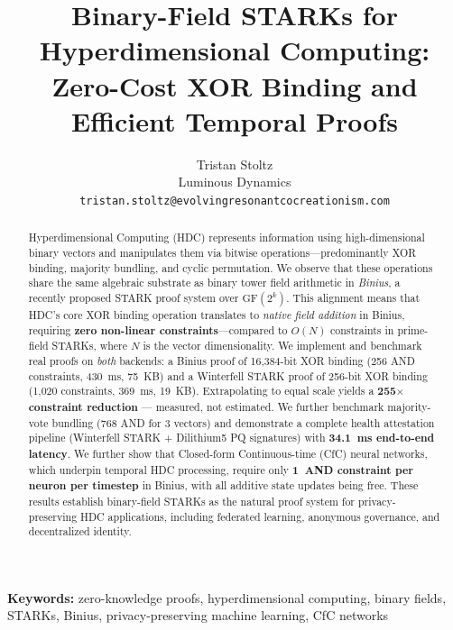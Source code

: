 \documentclass[11pt,twocolumn]{article}
\begin{document}
\title{Binary-Field STARKs for Hyperdimensional Computing:\\
Zero-Cost XOR Binding and Efficient Temporal Proofs}

\author{
Tristan Stoltz\\
Luminous Dynamics\\
\texttt{tristan.stoltz@evolvingresonantcocreationism.com}
}

\maketitle

\begin{abstract}
Hyperdimensional Computing (HDC) represents information using high-dimensional binary vectors and manipulates them via bitwise operations---predominantly XOR binding, majority bundling, and cyclic permutation. We observe that these operations share the same algebraic substrate as binary tower field arithmetic in \emph{Binius}, a recently proposed STARK proof system over $\mathrm{GF}(2^k)$. This alignment means that HDC's core XOR binding operation translates to \emph{native field addition} in Binius, requiring \textbf{zero non-linear constraints}---compared to $O(N)$ constraints in prime-field STARKs, where $N$ is the vector dimensionality. We implement and benchmark real proofs on \emph{both} backends: a Binius proof of 16,384-bit XOR binding (256 AND constraints, 430~ms, 75~KB) and a Winterfell STARK proof of 256-bit XOR binding (1,020 constraints, 369~ms, 19~KB). Extrapolating to equal scale yields a \textbf{255$\times$ constraint reduction} --- measured, not estimated. We further benchmark majority-vote bundling (768 AND for 3 vectors) and demonstrate a complete health attestation pipeline (Winterfell STARK + Dilithium5 PQ signatures) with \textbf{34.1~ms end-to-end latency}. We further show that Closed-form Continuous-time (CfC) neural networks, which underpin temporal HDC processing, require only \textbf{1~AND constraint per neuron per timestep} in Binius, with all additive state updates being free. These results establish binary-field STARKs as the natural proof system for privacy-preserving HDC applications, including federated learning, anonymous governance, and decentralized identity.
\end{abstract}

\noindent\textbf{Keywords:} zero-knowledge proofs, hyperdimensional computing, binary fields, STARKs, Binius, privacy-preserving machine learning, CfC networks
\vspace{1em}
\end{document}
